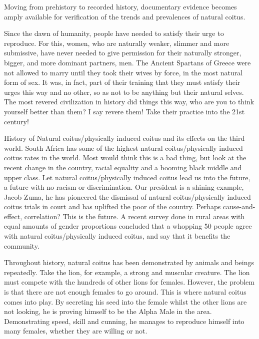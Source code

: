 Moving from prehistory to recorded history, documentary evidence becomes amply 
available for verification of the trends and prevalences of natural coitus.


Since the dawn of humanity, people have needed to satisfy their urge to 
reproduce. For this, women, who are naturally weaker, slimmer and more 
submissive, have never needed to give permission for their naturally stronger, 
bigger, and more dominant partners, men. The Ancient Spartans of Greece were not 
allowed to marry until they took their wives by force, in the most natural form 
of sex. It was, in fact, part of their training that they must satisfy their 
urges this way and no other, so as not to be anything but their natural selves. 
The most revered civilization in history did things this way, who are you to 
think yourself better than them? I say revere them! Take their practice into the 
21st century!


History of Natural coitus/physically induced coitus and its effects on the third 
world. South Africa has some of the highest natural coitus/physically induced 
coitus rates in the world. Most would think this is a bad thing, but look at the 
recent change in the country, racial equality and a booming black middle and 
upper class. Let natural coitus/physically induced coitus lead us into the 
future, a future with no racism or discrimination. Our president is a shining 
example, Jacob Zuma, he has pioneered the dismissal of natural coitus/physically 
induced coitus trials in court and has uplifted the poor of the country. Perhaps 
cause-and-effect, correlation? This is the future. A recent survey done in rural 
areas with equal amounts of gender proportions concluded that a whopping 50%
people agree with natural coitus/physically induced coitus, and say that it 
benefits the community.


Throughout history, natural coitus has been demonstrated by animals and beings 
repeatedly. Take the lion, for example, a strong and muscular creature. The lion 
must compete with the hundreds of other lions for females. However, the problem 
is that there are not enough females to go around. This is where natural coitus 
comes into play. By secreting his seed into the female whilst the other lions 
are not looking, he is proving himself to be the Alpha Male in the area. 
Demonstrating speed, skill and cunning, he manages to reproduce himself into 
many females, whether they are willing or not.

